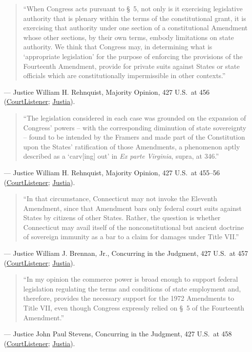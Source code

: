 \documentclass[12pt]{article}
\begin{document}
\begin{quote}
``When Congress acts pursuant to \S~5, not only is it exercising legislative authority that is plenary within the terms of the constitutional grant, it is exercising that authority under one section of a constitutional Amendment whose other sections, by their own terms, embody limitations on state authority. We think that Congress may, in determining what is `appropriate legislation' for the purpose of enforcing the provisions of the Fourteenth Amendment, provide for private suits against States or state officials which are constitutionally impermissible in other contexts.''
\end{quote}
\noindent --- Justice William H. Rehnquist, Majority Opinion, 427 U.S.\ at 456 (\href{https://www.courtlistener.com/opinion/109520/fitzpatrick-v-bitzer/}{CourtListener}; \href{https://supreme.justia.com/cases/federal/us/427/445/}{Justia}).

\begin{quote}
``The legislation considered in each case was grounded on the expansion of Congress' powers -- with the corresponding diminution of state sovereignty -- found to be intended by the Framers and made part of the Constitution upon the States' ratification of those Amendments, a phenomenon aptly described as a `carv[ing] out' in \textit{Ex parte Virginia}, supra, at 346.''
\end{quote}
\noindent --- Justice William H. Rehnquist, Majority Opinion, 427 U.S.\ at 455--56 (\href{https://www.courtlistener.com/opinion/109520/fitzpatrick-v-bitzer/}{CourtListener}; \href{https://supreme.justia.com/cases/federal/us/427/445/}{Justia}).

\begin{quote}
``In that circumstance, Connecticut may not invoke the Eleventh Amendment, since that Amendment bars only federal court suits against States by citizens of other States. Rather, the question is whether Connecticut may avail itself of the nonconstitutional but ancient doctrine of sovereign immunity as a bar to a claim for damages under Title VII.''
\end{quote}
\noindent --- Justice William J. Brennan, Jr., Concurring in the Judgment, 427 U.S.\ at 457 (\href{https://www.courtlistener.com/opinion/109520/fitzpatrick-v-bitzer/}{CourtListener}; \href{https://supreme.justia.com/cases/federal/us/427/445/}{Justia}).

\begin{quote}
``In my opinion the commerce power is broad enough to support federal legislation regulating the terms and conditions of state employment and, therefore, provides the necessary support for the 1972 Amendments to Title VII, even though Congress expressly relied on \S~5 of the Fourteenth Amendment.''
\end{quote}
\noindent --- Justice John Paul Stevens, Concurring in the Judgment, 427 U.S.\ at 458 (\href{https://www.courtlistener.com/opinion/109520/fitzpatrick-v-bitzer/}{CourtListener}; \href{https://supreme.justia.com/cases/federal/us/427/445/}{Justia}).
\end{document}
